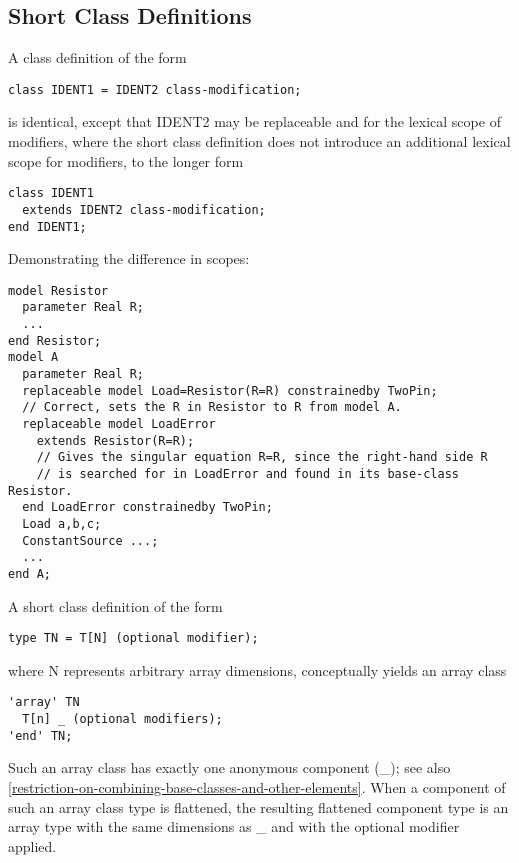 \subsection{Short Class Definitions}

A class definition of the form
\begin{lstlisting}[language=modelica]
class IDENT1 = IDENT2 class-modification;
\end{lstlisting}

is identical, except that IDENT2 may be replaceable and for the lexical
scope of modifiers, where the short class definition does not introduce
an additional lexical scope for modifiers, to the longer form

\begin{lstlisting}[language=modelica]
class IDENT1
  extends IDENT2 class-modification;
end IDENT1;
\end{lstlisting}

\begin{example}
Demonstrating the difference in scopes:
\begin{lstlisting}[language=modelica]
model Resistor
  parameter Real R;
  ...
end Resistor;
model A
  parameter Real R;
  replaceable model Load=Resistor(R=R) constrainedby TwoPin;
  // Correct, sets the R in Resistor to R from model A.
  replaceable model LoadError
    extends Resistor(R=R);
    // Gives the singular equation R=R, since the right-hand side R
    // is searched for in LoadError and found in its base-class Resistor.
  end LoadError constrainedby TwoPin;
  Load a,b,c;
  ConstantSource ...;
  ...
end A;
\end{lstlisting}
\end{example}

A short class definition of the form
\begin{lstlisting}[language=modelica]
type TN = T[N] (optional modifier);
\end{lstlisting}

where N represents arbitrary array dimensions, conceptually yields an
array class

\begin{lstlisting}[language=modelica]
'array' TN
  T[n] _ (optional modifiers);
'end' TN;
\end{lstlisting}

Such an array class has exactly one anonymous component (\_); see also
\autoref{restriction-on-combining-base-classes-and-other-elements}.
When a component of such an array class type is
flattened, the resulting flattened component type is an array type with
the same dimensions as \_ and with the optional modifier applied.

